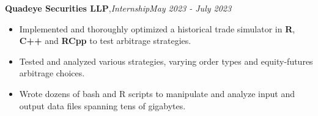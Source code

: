 \textbf{Quadeye Securities LLP}\sep{\it Internship}\hfill {\sl \small May 2023 - July 2023}\\
\vspace{-5pt}
\begin{itemize}[itemsep = -1.3 mm, leftmargin=*]
\item Implemented and thoroughly optimized a historical trade simulator in \textbf{R}, \textbf{C++} and \textbf{RCpp} to test arbitrage strategies.
\item Tested and analyzed various strategies, varying order types and equity-futures arbitrage choices.
\item Wrote dozens of bash and R scripts to manipulate and analyze input and output data files spanning tens of gigabytes.
\end{itemize}